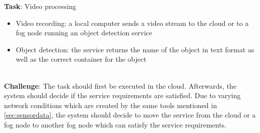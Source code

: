\textbf{Task}: Video processing
\begin{itemize}
    \item Video recording: a local computer sends a video stream to the cloud or to a fog node running an object detection service
    \item Object detection: the service returns the name of the object in text format as well as the correct container for the object
\end{itemize}
\\
\textbf{Challenge}: The task should first be executed in the cloud. Afterwards, the system should decide if the service requirements are satisfied. Due to varying network conditions which are created by the same tools mentioned in \ref{sec:sensordata}, the system should decide to move the service from the cloud or a fog node to another fog node which can satisfy the service requirements.